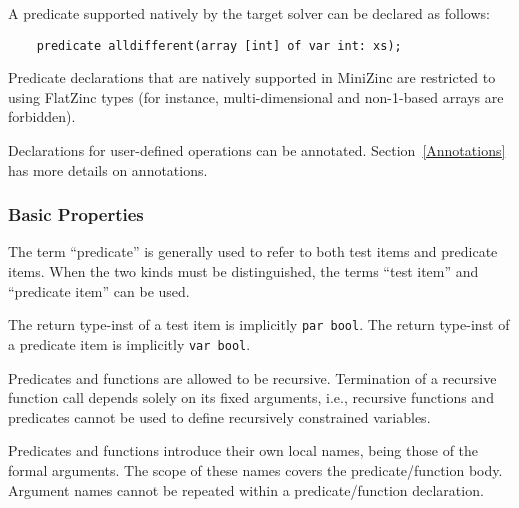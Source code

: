 \documentclass[10pt]{scrartcl}
\newcommand{\pjs}[1]{\textcolor{blue}{PJS:#1}}
\begin{document}

A predicate supported natively by the target solver can be declared as
follows:
\begin{verbatim}
    predicate alldifferent(array [int] of var int: xs);
\end{verbatim}
Predicate declarations that are natively supported 
in MiniZinc are restricted to using FlatZinc
types (for instance, multi-dimensional and non-1-based arrays are
forbidden).

Declarations for user-defined operations can be annotated.
Section~\ref{Annotations} has more details on annotations.

\subsubsection{Basic Properties}
        \label{Basic Properties}
The term ``predicate'' is generally used to refer to both test items and
predicate items.  When the two kinds must be distinguished, the terms ``test
item'' and ``predicate item'' can be used.

The return type-inst of a test item is implicitly \texttt{par bool}.  The
return type-inst of a predicate item is implicitly \texttt{var bool}.

Predicates and functions are allowed to be recursive. Termination of
a recursive function call depends solely on its fixed arguments, i.e., 
recursive functions and predicates cannot be used to define recursively 
constrained variables.

Predicates and functions introduce their own local names, being those of the
formal arguments.  The scope of these names covers the predicate/function
body.  Argument names cannot be repeated within a predicate/function
declaration.

\end{document}
